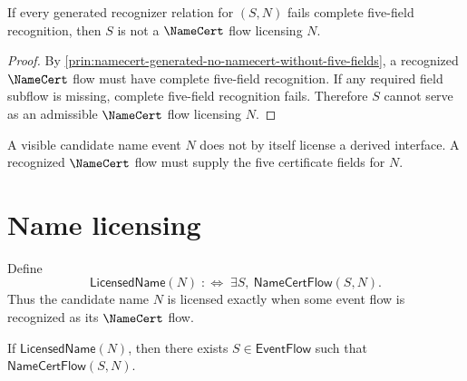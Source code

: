\begin{theorem}
\label{thm:namecert-generated-incomplete-does-not-license}
If every generated recognizer relation for $(S,N)$ fails complete five-field recognition, then $S$ is not a $\NameCert$ flow licensing $N$.
\end{theorem}

\begin{proof}
By \autoref{prin:namecert-generated-no-namecert-without-five-fields}, a recognized $\NameCert$ flow must have complete five-field recognition. If any required field subflow is missing, complete five-field recognition fails. Therefore $S$ cannot serve as an admissible $\NameCert$ flow licensing $N$.
\end{proof}

\begin{corollary}
\label{cor:namecert-generated-visible-name-insufficient}
A visible candidate name event $N$ does not by itself license a derived interface. A recognized $\NameCert$ flow must supply the five certificate fields for $N$.
\end{corollary}

\section{Name licensing}
\label{sec:namecert-generated-licensing}

\begin{definition}
\label{def:namecert-generated-licensed-name}
Define
$$
  \mathsf{LicensedName}(N)
  \;:\Longleftrightarrow\;
  \exists S,\ \mathsf{NameCertFlow}(S,N).
$$
Thus the candidate name $N$ is licensed exactly when some event flow is recognized as its $\NameCert$ flow.
\end{definition}

\begin{proposition}
\label{prop:namecert-generated-licensing-event-flow-based}
If $\mathsf{LicensedName}(N)$, then there exists $S \in \mathsf{EventFlow}$ such that $\mathsf{NameCertFlow}(S,N)$.
\end{proposition}

